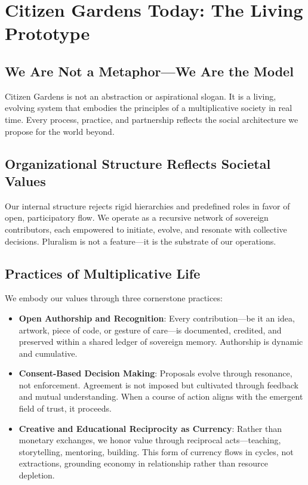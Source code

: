 \documentclass[12pt]{article}
\begin{document}
\section{Citizen Gardens Today: The Living Prototype}

\subsection{We Are Not a Metaphor—We Are the Model}

Citizen Gardens is not an abstraction or aspirational slogan. It is a living, evolving system that embodies the principles of a multiplicative society in real time. Every process, practice, and partnership reflects the social architecture we propose for the world beyond.

\subsection{Organizational Structure Reflects Societal Values}

Our internal structure rejects rigid hierarchies and predefined roles in favor of open, participatory flow. We operate as a recursive network of sovereign contributors, each empowered to initiate, evolve, and resonate with collective decisions. Pluralism is not a feature—it is the substrate of our operations.

\subsection{Practices of Multiplicative Life}

We embody our values through three cornerstone practices:

\begin{itemize}
  \item \textbf{Open Authorship and Recognition}: Every contribution—be it an idea, artwork, piece of code, or gesture of care—is documented, credited, and preserved within a shared ledger of sovereign memory. Authorship is dynamic and cumulative.

  \item \textbf{Consent-Based Decision Making}: Proposals evolve through resonance, not enforcement. Agreement is not imposed but cultivated through feedback and mutual understanding. When a course of action aligns with the emergent field of trust, it proceeds.

  \item \textbf{Creative and Educational Reciprocity as Currency}: Rather than monetary exchanges, we honor value through reciprocal acts—teaching, storytelling, mentoring, building. This form of currency flows in cycles, not extractions, grounding economy in relationship rather than resource depletion.
\end{itemize}
\end{document}
